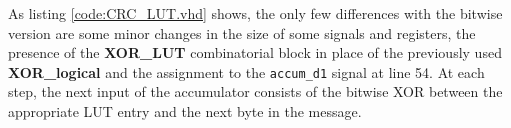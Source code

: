 \lstset{style=codestyle}\label{code:CRC_LUT.vhd}

\hfill \break
As listing \ref{code:CRC_LUT.vhd} shows, the only few differences with the bitwise version are some minor changes in the size of some signals and registers, the presence of the \textbf{XOR\_LUT} combinatorial block in place of the previously used \textbf{XOR\_logical} and the assignment to the \texttt{accum\_d1} signal at line 54. At each step, the next input of the accumulator consists of the bitwise XOR between the appropriate LUT entry and the next byte in the message.